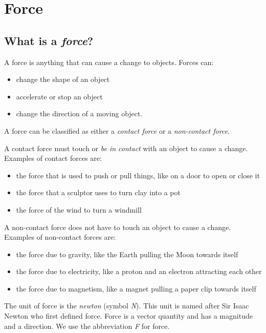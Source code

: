 \section{Force}

\subsection{What is a \textit{force}?}
A force is anything that can cause a change to objects. Forces can:
\begin{itemize}
\item change the shape of an object
\item accelerate or stop an object
\item change the direction of a moving object.
\end{itemize}

A force can be classified as either a \textit{contact force} or a \textit{non-contact force}.

A contact force must touch or \textit{be in contact} with an object to cause a change. Examples of contact forces are:
\begin{itemize}
\item the force that is used to push or pull things, like on a door to open or close it
\item the force that a sculptor uses to turn clay into a pot
\item the force of the wind to turn a windmill
\end{itemize}


A non-contact force does not have to touch an object to cause a change. Examples of non-contact forces are:
\begin{itemize}
\item the force due to gravity, like the Earth pulling the Moon towards itself
\item the force due to electricity, like a proton and an electron attracting each other
\item the force due to magnetism, like a magnet pulling a paper clip towards itself
\end{itemize}

The unit of force is the \emph{newton} (symbol \emph{N}). This unit is named after Sir Isaac Newton who first defined force. Force is a vector quantity and has a magnitude and a direction. We use the abbreviation \emph{F} for force.

